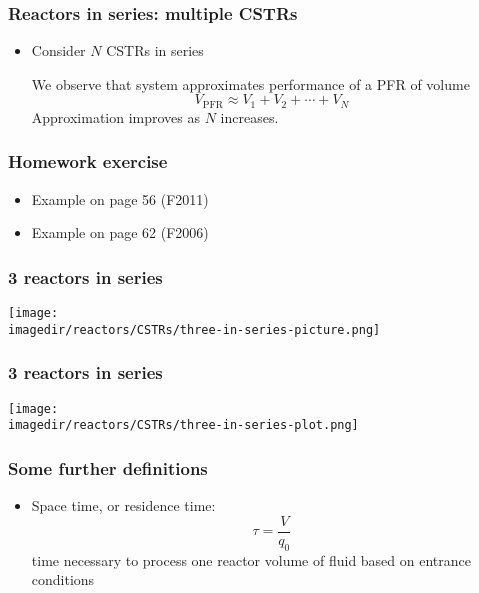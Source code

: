 
\begin{frame}\frametitle{Reactors in series: multiple CSTRs}
	\begin{itemize}
		\item	Consider $N$ CSTRs in series

		We observe that system approximates performance of a PFR of volume $$V_\text{PFR} \approx V_1 + V_2 + \cdots + V_N$$ Approximation improves as $N$ increases.
	\end{itemize}
\end{frame}

\begin{frame}\frametitle{Homework exercise}
	\begin{itemize}
		\item	Example on page 56 (F2011)
		\item	Example on page 62 (F2006)
	\end{itemize}
\end{frame}

\begin{frame}\frametitle{3 reactors in series}
	\begin{center}
		\texttt{[image: \\imagedir/reactors/CSTRs/three-in-series-picture.png]}
	\end{center}
\end{frame}

\begin{frame}\frametitle{3 reactors in series}
	\begin{center}
		\texttt{[image: \\imagedir/reactors/CSTRs/three-in-series-plot.png]}
	\end{center}
\end{frame}

\begin{frame}\frametitle{Some further definitions}
	\begin{itemize}
		\item	Space time, or residence time:
		$$\tau = \frac{V}{q_0}$$ time necessary to process one reactor volume of fluid based on entrance conditions
	\end{itemize}
\end{frame}
